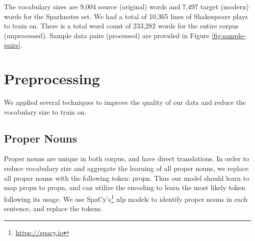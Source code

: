 \documentclass[twoside,twocolumn]{article}
\begin{document}
The vocabulary sizes are 9,004 source (original) words and
7,497 target (modern) words for the Sparknotes set. We had a total of 10,365
lines of Shakespeare plays to train on. There is a total word count of 233,282
words for the entire corpus (unprocessed). Sample data pairs (processed) are
provided in Figure \ref{fig:sample-pairs}.
\begin{figure*}[ht]
  \centering
  \caption{Sample Original-Modern Sentence Pairs, Processed}
  \label{fig:sample-pairs}
\end{figure*}
\section{Preprocessing}
\label{sec:preprocess}
We applied several techniques to improve the quality of our data and reduce the
vocabulary size to train on.
\subsection{Proper Nouns}
Proper nouns are unique in both corpus, and have direct translations. In order
to reduce vocabulary size and aggregate the learning of all proper nouns,
we replace all proper nouns with the following token: propn. Thus our model
should learn to map propn to propn, and can utilize the encoding to learn the
most likely token following its usage. We use
SpaCy's\footnote{\url{https://spacy.io}} nlp models to identify
proper nouns in each sentence, and replace the tokens.
\end{document}
